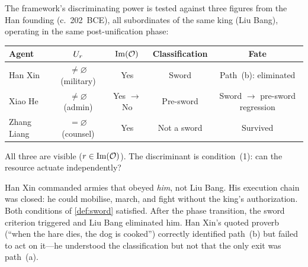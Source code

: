 The framework's discriminating power is tested against three figures from
the Han founding (c.~202~BCE), all subordinates of the same king (Liu
Bang), operating in the same post-unification phase:

\begin{center}
\begin{tabular}{@{}lcccc@{}}
\toprule
\textbf{Agent} & $U_r$ & $\mathrm{Im}(\mathcal{O})$ &
\textbf{Classification} & \textbf{Fate} \\
\midrule
Han Xin & $\neq \varnothing$ (military) & Yes & Sword &
Path~(b): eliminated \\
Xiao He & $\neq \varnothing$ (admin) & Yes $\to$ No & Pre-sword &
Sword $\to$ pre-sword regression \\
Zhang Liang & $= \varnothing$ (counsel) & Yes & Not a sword &
Survived \\
\bottomrule
\end{tabular}
\end{center}

All three are visible ($r \in \mathrm{Im}(\mathcal{O})$). The discriminant is
condition~(1): can the resource actuate independently?

\begin{example}\label{ex:hanxin}
Han Xin commanded armies that obeyed \emph{him}, not Liu Bang. His
execution chain was closed: he could mobilise, march, and fight without
the king's authorization. Both conditions of \cref{def:sword} satisfied.
After the phase transition, the sword criterion triggered and Liu Bang
eliminated him. Han Xin's quoted proverb (``when the hare dies, the dog
is cooked'') correctly identified path~(b) but failed to act on it---he
understood the classification but not that the only exit was path~(a).
\end{example}

